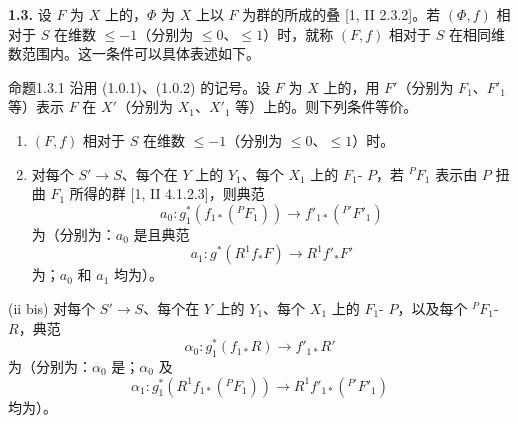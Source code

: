 \textbf{1.3.} 设 $F$ 为 $X$ 上的，$\Phi$ 为 $X$ 上以 $F$ 为群的所成的叠 [1, II 2.3.2]。若 $(\Phi,f)$ 相对于 $S$ 在维数 $\leqslant-1$（分别为 $\leqslant0$、$\leqslant1$）时，就称 $(F,f)$ 相对于 $S$ 在相同维数范围内。这一条件可以具体表述如下。
\begin{SGAresult}{命题}{1.3.1}
沿用 (1.0.1)、(1.0.2) 的记号。设 $F$ 为 $X$ 上的，用 $F'$（分别为 $F_1$、$F'_1$ 等）表示 $F$ 在 $X'$（分别为 $X_1$、$X'_1$ 等）上的。则下列条件等价。
\begin{enumerate}[label=(\roman*)]
\item $(F,f)$ 相对于 $S$ 在维数 $\leqslant-1$（分别为 $\leqslant0$、$\leqslant1$）时。
\item 对每个 $S'\to S$、每个在 $Y$ 上的 $Y_1$、每个 $X_1$ 上的 $F_1$- $P$，若 ${}^PF_1$ 表示由 $P$ 扭曲 $F_1$ 所得的群 [1, II 4.1.2.3]，则典范
\[a_0:g_1^*(f_{1*}({}^PF_1))\longrightarrow f'_{1*}({}^{P'}F'_1)\]
为（分别为：$a_0$ 是且典范
\[a_1:g^*(R^1f_*F)\longrightarrow R^1f'_*F'\]
为；$a_0$ 和 $a_1$ 均为）。
\end{enumerate}
\noindent(ii bis) 对每个 $S'\to S$、每个在 $Y$ 上的 $Y_1$、每个 $X_1$ 上的 $F_1$- $P$，以及每个 ${}^PF_1$- $R$，典范
\[\alpha_0:g_1^*(f_{1*}R)\longrightarrow f'_{1*}R'\]
为（分别为：$\alpha_0$ 是；$\alpha_0$ 及
\[\alpha_1:g_1^*(R^1f_{1*}({}^PF_1))\longrightarrow R^1f'_{1*}({}^{P'}F'_1)\]
均为）。
\end{SGAresult}
